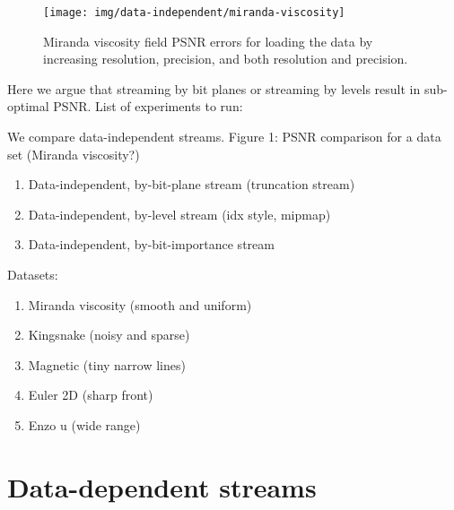 \begin{figure}
        \centering
        \texttt{[image: img/data-independent/miranda-viscosity]}
        \caption{Miranda viscosity field PSNR errors for loading the data by increasing resolution,
                 precision, and both resolution and precision.}
        \label{fig:viscosity-psnr}
\end{figure}



Here we argue that streaming by bit planes or streaming by levels result in sub-optimal PSNR.
List of experiments to run:

We compare data-independent streams. Figure 1: PSNR comparison for a data set (Miranda viscosity?)
    \begin{enumerate}
      \item Data-independent, by-bit-plane stream (truncation stream)
      \item Data-independent, by-level stream (idx style, mipmap)
      \item Data-independent, by-bit-importance stream
    \end{enumerate}


Datasets:

\begin{enumerate}
        \item Miranda viscosity (smooth and uniform)
        \item Kingsnake (noisy and sparse)
        \item Magnetic (tiny narrow lines)
        \item Euler 2D (sharp front)
        \item Enzo u (wide range)
\end{enumerate}



\section{Data-dependent streams}

